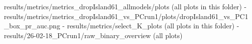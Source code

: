  results/metrics/metrics_dropIsland61_allmodels/plots (all plots in this folder)
- results/metrics/metrics_dropIsland61_vs_PCrun1/plots/dropIsland61_vs_PC1_box_pr_auc.png
- results/metrics/select_K_plots (all plots in this folder)
- results/26-02-18_PCrun1/raw_binary_overview (all plots)